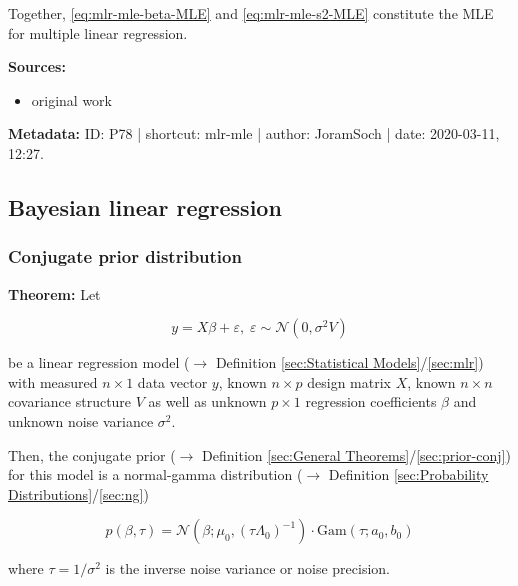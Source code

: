 \documentclass[a4paper,12pt,twoside]{book}
\begin{document}
\vspace{1em}
Together, \eqref{eq:mlr-mle-beta-MLE} and \eqref{eq:mlr-mle-s2-MLE} constitute the MLE for multiple linear regression.


\vspace{1em}
\textbf{Sources:}
\begin{itemize}
\item original work\end{itemize}


\vspace{1em}
\textbf{Metadata:} ID: P78 | shortcut: mlr-mle | author: JoramSoch | date: 2020-03-11, 12:27.
\vspace{1em}



\subsection{Bayesian linear regression}

\subsubsection[\textbf{Conjugate prior distribution}]{Conjugate prior distribution} \label{sec:blr-prior}
\setcounter{equation}{0}

\textbf{Theorem:} Let

\begin{equation} \label{eq:blr-prior-GLM}
y = X \beta + \varepsilon, \; \varepsilon \sim \mathcal{N}(0, \sigma^2 V)
\end{equation}

be a linear regression model ($\rightarrow$ Definition \ref{sec:Statistical Models}/\ref{sec:mlr}) with measured $n \times 1$ data vector $y$, known $n \times p$ design matrix $X$, known $n \times n$ covariance structure $V$ as well as unknown $p \times 1$ regression coefficients $\beta$ and unknown noise variance $\sigma^2$.

Then, the conjugate prior ($\rightarrow$ Definition \ref{sec:General Theorems}/\ref{sec:prior-conj}) for this model is a normal-gamma distribution ($\rightarrow$ Definition \ref{sec:Probability Distributions}/\ref{sec:ng})

\begin{equation} \label{eq:blr-prior-GLM-NG-prior}
p(\beta,\tau) = \mathcal{N}(\beta; \mu_0, (\tau \Lambda_0)^{-1}) \cdot \mathrm{Gam}(\tau; a_0, b_0)
\end{equation}

where $\tau = 1/\sigma^2$ is the inverse noise variance or noise precision.
\end{document}
